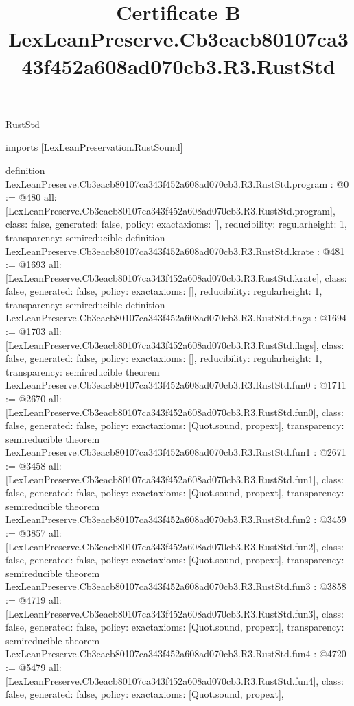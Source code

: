 \begin{lexlean}{RustStd}
\title{Certificate B LexLeanPreserve.Cb3eacb80107ca343f452a608ad070cb3.R3.RustStd}
\begin{coremodule}
imports [LexLeanPreservation.RustSound]

definition LexLeanPreserve.Cb3eacb80107ca343f452a608ad070cb3.R3.RustStd.program : @0 := @480 {
  all: [LexLeanPreserve.Cb3eacb80107ca343f452a608ad070cb3.R3.RustStd.program],
  class: false,
  generated: false,
  policy: exact{axioms: []},
  reducibility: regular{height: 1},
  transparency: semireducible
}
definition LexLeanPreserve.Cb3eacb80107ca343f452a608ad070cb3.R3.RustStd.krate : @481 := @1693 {
  all: [LexLeanPreserve.Cb3eacb80107ca343f452a608ad070cb3.R3.RustStd.krate],
  class: false,
  generated: false,
  policy: exact{axioms: []},
  reducibility: regular{height: 1},
  transparency: semireducible
}
definition LexLeanPreserve.Cb3eacb80107ca343f452a608ad070cb3.R3.RustStd.flags : @1694 := @1703 {
  all: [LexLeanPreserve.Cb3eacb80107ca343f452a608ad070cb3.R3.RustStd.flags],
  class: false,
  generated: false,
  policy: exact{axioms: []},
  reducibility: regular{height: 1},
  transparency: semireducible
}
theorem LexLeanPreserve.Cb3eacb80107ca343f452a608ad070cb3.R3.RustStd.fun0 : @1711 := @2670 {
  all: [LexLeanPreserve.Cb3eacb80107ca343f452a608ad070cb3.R3.RustStd.fun0],
  class: false,
  generated: false,
  policy: exact{axioms: [Quot.sound, propext]},
  transparency: semireducible
}
theorem LexLeanPreserve.Cb3eacb80107ca343f452a608ad070cb3.R3.RustStd.fun1 : @2671 := @3458 {
  all: [LexLeanPreserve.Cb3eacb80107ca343f452a608ad070cb3.R3.RustStd.fun1],
  class: false,
  generated: false,
  policy: exact{axioms: [Quot.sound, propext]},
  transparency: semireducible
}
theorem LexLeanPreserve.Cb3eacb80107ca343f452a608ad070cb3.R3.RustStd.fun2 : @3459 := @3857 {
  all: [LexLeanPreserve.Cb3eacb80107ca343f452a608ad070cb3.R3.RustStd.fun2],
  class: false,
  generated: false,
  policy: exact{axioms: [Quot.sound, propext]},
  transparency: semireducible
}
theorem LexLeanPreserve.Cb3eacb80107ca343f452a608ad070cb3.R3.RustStd.fun3 : @3858 := @4719 {
  all: [LexLeanPreserve.Cb3eacb80107ca343f452a608ad070cb3.R3.RustStd.fun3],
  class: false,
  generated: false,
  policy: exact{axioms: [Quot.sound, propext]},
  transparency: semireducible
}
theorem LexLeanPreserve.Cb3eacb80107ca343f452a608ad070cb3.R3.RustStd.fun4 : @4720 := @5479 {
  all: [LexLeanPreserve.Cb3eacb80107ca343f452a608ad070cb3.R3.RustStd.fun4],
  class: false,
  generated: false,
  policy: exact{axioms: [Quot.sound, propext]},
}
\end{coremodule}
\end{lexlean}
